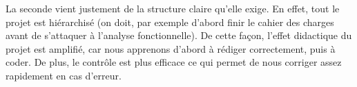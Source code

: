La seconde vient justement de la structure claire qu'elle exige. 
En effet, tout le projet est hiérarchisé (on doit, par exemple d'abord finir le cahier des charges avant de s'attaquer à l'analyse fonctionnelle). 
De cette façon, l'effet didactique du projet est amplifié, car nous apprenons d'abord à rédiger correctement, puis à coder. 
De plus, le contrôle est plus efficace ce qui permet de nous corriger assez rapidement en cas d'erreur.
